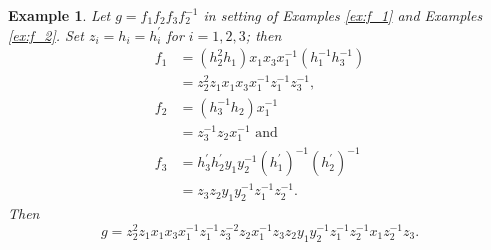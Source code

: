 \documentclass[a4paper,12pt]{article}
\newtheorem{exam}[theorem]{Example}
\newenvironment{example}{\begin{exam} \rm}{\end{exam}}
\numberwithin{equation}{section}
\numberwithin{figure}{section}
\begin{document}
\begin{example}\label{ex:g}
Let $g =f_1 f_2 f_3 f_2^{-1}$ in setting  of Examples \ref{ex:f_1} and 
Examples \ref{ex:f_2}.
Set $z_i = h_i = h_i^{\prime}$ for $i= 1,2,3$; then
\begin{align*}
f_1&=(h_2^{2}h_1) x_1x_3x_1^{-1} (h_1^{-1}h_3^{-1})\\
&=z_2^2z_1  x_1x_3x_1^{-1}z_1^{-1}z_3^{-1},\\
f_2&=(h_3^{-1}h_2) x_1^{-1}\\
&=z_3^{-1}z_2 x_1^{-1}\textrm{ and }\\
f_3&=h^\prime_3h_2^\prime y_1y_2^{-1} (h_1^\prime)^{-1}(h_2^\prime)^{-1}\\
&= z_3z_2 y_1y_2^{-1} z_1^{-1}z_2^{-1}.
\end{align*}
Then 
\[g=z_2^2 z_1  x_1 x_3 x_1^{-1} z_1^{-1} z_3^{-2}
z_2 x_1^{-1} 
z_3z_2 y_1y_2^{-1} z_1^{-1}z_2^{-1}
x_1z_2^{-1}z_3.
\]
\end{example}
\end{document}
